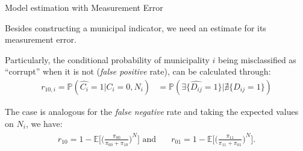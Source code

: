 \documentclass[handout,t,usenames,dvipsnames]{beamer}
\begin{document}
\begin{frame}{Model estimation with Measurement Error}
\justifying
\vspace{0.5em}

Besides constructing a municipal indicator, we need an estimate for its measurement error. 
\vspace{0.5em}

Particularly, the conditional probability of municipality $i$ being misclassified as ``corrupt'' when it is not (\textit{false positive} rate), can be calculated through:
\begin{align*}
    r_{10,i} = \mathbb{P}(\hat{C_i}=1|C_i=0, N_i) &= \mathbb{P}(\exists \{\hat{D_{ij}} = 1\} | \nexists \{D_{ij} = 1\})
\end{align*}

The case is analogous for the \textit{false negative} rate and taking the expected values on $N_i$, we have:
\begin{align*}
    \begin{split}
    r_{10} = 1 - \mathbb{E}\Big[\Big(\frac{\pi_{00}}{\pi_{00}+\pi_{10}}\Big)^{N} \Big]
    \text{ and} & \quad
    r_{01} = 1-  \mathbb{E}\Big[\Big(\frac{\pi_{11}}{\pi_{11}+\pi_{01}}\Big)^{N} \Big].
    \end{split}
\end{align*}
\vspace{0.5em}


\end{frame}
\end{document}
